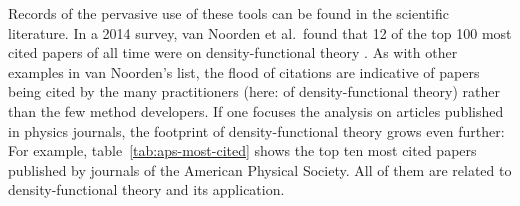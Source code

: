 \documentclass[9pt,review]{livecoms}
\begin{document}

Records of the pervasive use of these tools can be found in the scientific literature.
In a 2014 survey, van Noorden et al.\ found that 12 of the top 100 most cited papers of all time were on density-functional theory \cite{VanNoorden2014}.
As with other examples in van Noorden's list, the flood of citations are indicative of papers being cited by the many practitioners (here: of density-functional theory) rather than the few method developers.
If one focuses the analysis on articles published in physics journals, the footprint of density-functional theory grows even further:
For example, table~\ref{tab:aps-most-cited} shows the top ten most cited papers published by journals of the American Physical Society.
All of them are related to density-functional theory and its application.
\end{document}
